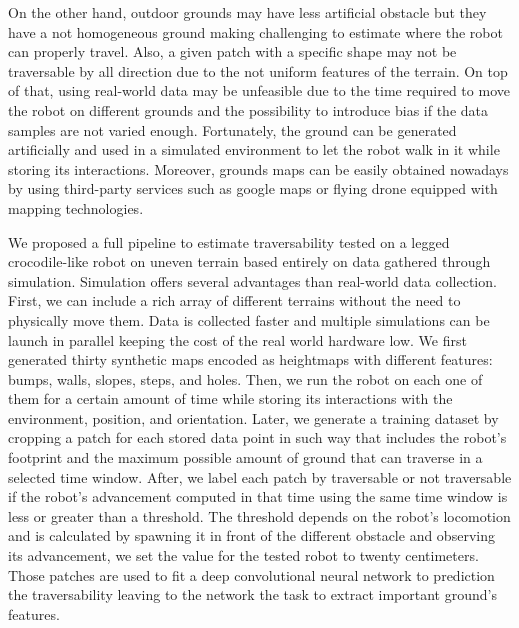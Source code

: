 \documentclass[../document.tex]{subfiles}
\begin{document}
On the other hand, outdoor grounds may have less artificial obstacle but they have a not homogeneous ground making challenging to estimate where the robot can properly travel. Also, a given patch with a specific shape may not be traversable by all direction due to the not uniform features of the terrain. On top of that, using real-world data may be unfeasible due to the time required to move the robot on different grounds and the possibility to introduce bias if the data samples are not varied enough. Fortunately, the ground can be generated artificially and used in a simulated environment to let the robot walk in it while storing its interactions. Moreover, grounds maps can be easily obtained nowadays by using third-party services such as google maps or flying drone equipped with mapping technologies.

We proposed a full pipeline to estimate traversability tested on a legged crocodile-like robot on uneven terrain based entirely on data gathered through simulation. Simulation offers several advantages than real-world data collection. First, we can include a rich array of different terrains without the need to physically move them. Data is collected faster and multiple simulations can be launch in parallel keeping the cost of the real world hardware low. We first generated thirty synthetic maps encoded as heightmaps with different features: bumps, walls, slopes, steps, and holes. Then, we run the robot on each one of them for a certain amount of time while storing its interactions with the environment, position, and orientation. Later, we generate a training dataset by cropping a patch for each stored data point in such way that includes the robot's footprint and the maximum possible amount of ground that can traverse in a selected time window. After, we label each patch by traversable or not traversable if the robot's advancement computed in that time using the same time window is less or greater than a threshold. The threshold depends on the robot's locomotion and is calculated by spawning it in front of the different obstacle and observing its advancement, we set the value for the tested robot to twenty centimeters. Those patches are used to fit a deep convolutional neural network to prediction the traversability leaving to the network the task to extract important ground's features.
\end{document}
